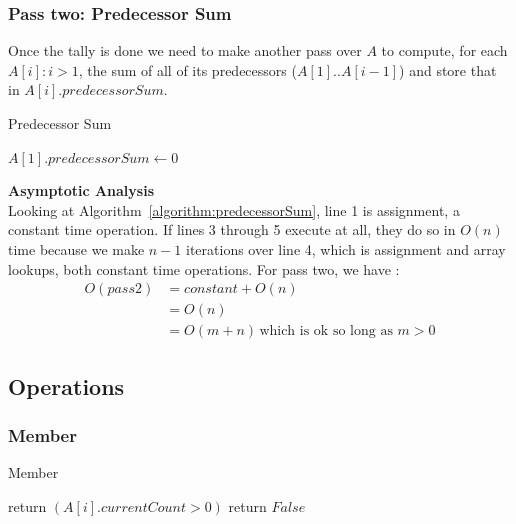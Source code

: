 \documentclass[10pt]{article}
\begin{document}
\subsubsection{Pass two: Predecessor Sum}
Once the tally is done we need to make another pass over $A$ to compute, for each $A[i] : i>1$, 
the sum of all of its predecessors ($A[1] .. A[i-1]$) and store that in $A[i].predecessorSum$.

\begin{algorithm}[H]
    \SetAlgoLined
    \caption{Predecessor Sum}
    \label{algorithm:predecessorSum}
   
    $A[1].predecessorSum \leftarrow 0$\;
    {
   }
\end{algorithm}

\textbf{Asymptotic Analysis}\\
Looking at Algorithm~\ref{algorithm:predecessorSum}, line 1 is assignment, a constant time operation.
If lines 3 through 5 execute at all, they do so in $O(n)$ time because we make $n - 1$ iterations over line 4, which is assignment and array lookups, both constant time operations.
For pass two, we have :
\begin{equation}
   \label{equation:pass2}   
   \begin{split}       
       O(pass2) & = constant + O(n) \\
                & = O(n) \\
                & = O(m+n) \, \text{which is ok so long as $m > 0$}   
    \end{split}
\end{equation}


\subsection{Operations}\label{operations}

\subsubsection{Member}

\begin{algorithm}[H]
    \SetAlgoLined
    \caption{Member}
    \label{algorithm:member}
     
     {
        return $(A[i].currentCount > 0)$\;
    } {
        return $False$\;
   }
\end{algorithm}
\end{document}
